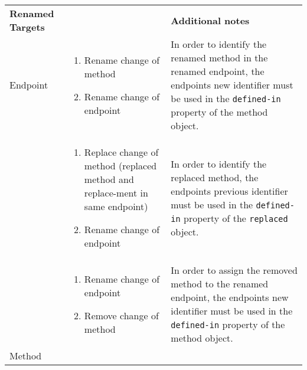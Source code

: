 	\begin{longtable}{@{}p{}>{\raggedright\arraybackslash}p{}p{}@{}}
		\toprule
		\multirow{2}{0.34\textwidth}{\textbf{Renamed \newline Targets}} & \multirow{2}{0.34\textwidth}{\textbf{Order of changes}} & \multirow{2}{0.34\textwidth}{\textbf{Additional notes}} \\ 
		  &  & \\ \midrule \endhead
		Endpoint                   &      \vspace{-2em}\begin{enumerate}[leftmargin=*]
			\setlength\itemsep{0.05em}
			\item Rename change of method
			\item Rename change of endpoint
		\end{enumerate}           &    In order to identify the renamed method in the renamed endpoint,  the endpoints new identifier must be used in the \texttt{defined-in} property of the method object.      \\
		                  &      \vspace{-2em}\begin{enumerate}[leftmargin=*]
		\setlength\itemsep{0.05em}
		\item Replace change of method (replaced method and re\-place-\newline ment in same endpoint)
		\item Rename change of endpoint
	\end{enumerate}           &     In order to identify the replaced method, the endpoints previous identifier must be used in the \texttt{defined-in} property of the \texttt{replaced} object.      \\
		                  &      \vspace{-2em}\begin{enumerate}[leftmargin=*]
	\setlength\itemsep{0.05em}
	\item Rename change of endpoint
	\item Remove change of method
\end{enumerate}           &     In order to assign the removed method to the renamed endpoint, the endpoints new identifier must be used in the \texttt{defined-in} property of the method object.       \\ \midrule
	\pagebreak	Method                   &      \vspace{-2em}\begin{enumerate}[leftmargin=*]

\end{enumerate}
\end{longtable}
